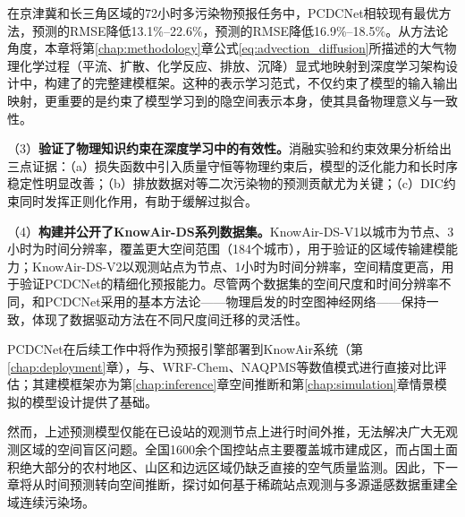 \noindent 在京津冀和长三角区域的72小时多污染物预报任务中，PCDCNet相较现有最优方法，\PM 预测的RMSE降低13.1\%--22.6\%，\ozone 预测的RMSE降低16.9\%--18.5\%。从方法论角度，本章将第\ref{chap:methodology}章公式\eqref{eq:advection_diffusion}所描述的大气物理化学过程（平流、扩散、化学反应、排放、沉降）显式地映射到深度学习架构设计中，构建了的完整建模框架。这种的表示学习范式，不仅约束了模型的输入输出映射，更重要的是约束了模型学习到的隐空间表示本身，使其具备物理意义与一致性。

（3）\textbf{验证了物理知识约束在深度学习中的有效性。}消融实验和约束效果分析给出三点证据：（a）损失函数中引入质量守恒等物理约束后，模型的泛化能力和长时序稳定性明显改善；（b）排放数据对\ozone 等二次污染物的预测贡献尤为关键；（c）DIC约束同时发挥正则化作用，有助于缓解过拟合。

（4）\textbf{构建并公开了KnowAir-DS系列数据集。}KnowAir-DS-V1以城市为节点、3小时为时间分辨率，覆盖更大空间范围（184个城市），用于验证\ModelPred{}的区域传输建模能力；KnowAir-DS-V2以观测站点为节点、1小时为时间分辨率，空间精度更高，用于验证PCDCNet的精细化预报能力。尽管两个数据集的空间尺度和时间分辨率不同，\ModelPred{}和PCDCNet采用的基本方法论——物理启发的时空图神经网络——保持一致，体现了数据驱动方法在不同尺度间迁移的灵活性。

PCDCNet在后续工作中将作为预报引擎部署到KnowAir系统（第\ref{chap:deployment}章），与\CMAQ、WRF-Chem、NAQPMS等数值模式进行直接对比评估；其建模框架亦为第\ref{chap:inference}章空间推断和第\ref{chap:simulation}章情景模拟的模型设计提供了基础。

然而，上述预测模型仅能在已设站的观测节点上进行时间外推，无法解决广大无观测区域的空间盲区问题。全国1600余个国控站点主要覆盖城市建成区，而占国土面积绝大部分的农村地区、山区和边远区域仍缺乏直接的空气质量监测。因此，下一章将从时间预测转向空间推断，探讨如何基于稀疏站点观测与多源遥感数据重建全域连续污染场。